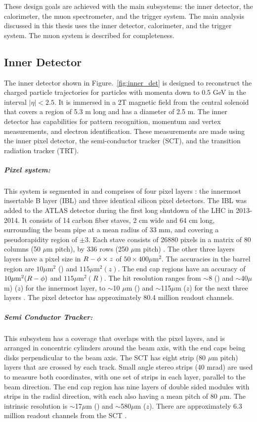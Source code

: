 These design goals are achieved with the main subsystems: the inner detector, the calorimeter, the muon spectrometer, and the trigger system.
The main analysis discussed in this thesis uses the inner detector, calorimeter, and the trigger system.
The muon system is described for completeness.


\subsection{Inner Detector}
The inner detector shown in Figure.~\ref{fig:inner_det} is designed to reconstruct the charged particle trajectories for particles with momenta down to 0.5 GeV in the interval $|\eta| < 2.5$.
It is immersed in a 2T magnetic field from the central solenoid that covers a region of 5.3 m long and has a diameter of 2.5 m.
The inner detector has capabilities for pattern recognition, momentum and vertex measurements, and electron identification.
These measurements are made using the inner pixel detector, the semi-conductor tracker (SCT), and the transition radiation tracker (TRT).


\subparagraph{Pixel system: } This system is segmented in \rphi and comprises of four pixel layers : the innermost insertable B layer (IBL) and three identical silicon pixel detectors.
The IBL was added to the ATLAS detector during the first long shutdown of the LHC in 2013-2014.
It consists of 14 carbon fiber staves, 2 cm wide and 64 cm long, surrounding the beam pipe at a mean radius of 33 mm, and covering a pseudorapidity region of $\pm 3$.
Each stave consists of 26880 pixels in a matrix of 80 columns (50 $\mu$m pitch), by 336 rows (250 $\mu$m pitch) \cite{LaRosa:2016nbd, Capeans:1291633}.
The other three layers layers have a pixel size in $\mbox{$R - \phi$} \times z$ of $50 \times 400 \mu \mathrm{m}^2$.
The accuracies in the barrel region are $10 \mu \mathrm{m}^2$ (\rphi) and $115 \mu \mathrm{m}^2 (z)$.
The end cap regions have an accuracy of $10 \mu \mathrm{m}^2 (\mbox{$R - \phi$}) $ and $115 \mu \mathrm{m}^2 (R)$.
The hit resolution ranges from $\sim$8 (\rphi) and $\sim$40$\mu$m) ($z$) for the innermost layer, to $\sim$10 $\mu$m (\rphi) and $\sim$115$\mu$m ($z$) for the next three layers \cite{Aad:2008zzm}.
The pixel detector has approximately 80.4 million readout channels.


\subparagraph{Semi Conductor Tracker:} This subsystem has a coverage that overlaps with the pixel layers, and is arranged in concentric cylinders around the beam axis, with the end caps being disks perpendicular to the beam axis.
The SCT has eight strip (80 $\mu$m pitch) layers that are crossed by each track.
Small angle stereo strips (40 mrad) are used to measure both coordinates, with one set of strips in each layer, parallel to the beam direction.
The end cap region has nine layers of double sided modules with strips in the radial direction, with each also having a mean pitch of 80 $\mu$m.
The intrinsic resolution is $\sim$17$\mu$m (\rphi) and $\sim$580$\mu$m ($z$).
There are approximately 6.3 million readout channels from the SCT \cite{Aad:2008zzm}.


